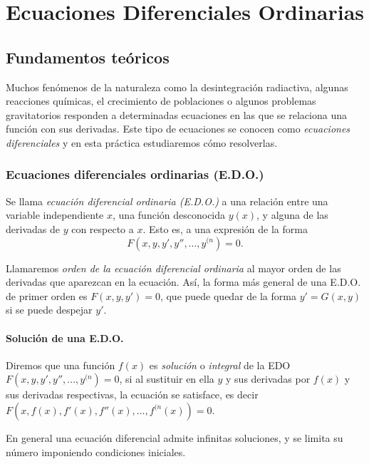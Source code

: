 
\chapter{Ecuaciones Diferenciales Ordinarias}

\section{Fundamentos teóricos}

Muchos fenómenos de la naturaleza como la desintegración radiactiva, algunas reacciones químicas, el crecimiento de
poblaciones o algunos problemas gravitatorios responden a determinadas ecuaciones en las que se relaciona una función
con sus derivadas. 
Este tipo de ecuaciones se conocen como \emph{ecuaciones diferenciales} y en esta práctica
estudiaremos cómo resolverlas.

\subsection{Ecuaciones diferenciales ordinarias (E.D.O.)}
Se llama \emph{ecuación diferencial ordinaria (E.D.O.)} a una relación entre una variable independiente $x$, una función
desconocida $y(x)$, y alguna de las derivadas de $y$ con respecto a $x$. 
Esto es, a una expresión de la forma
\[
F(x,y,y',y'',...,y^{(n})=0.
\]

Llamaremos \emph{orden de la ecuación diferencial ordinaria} al mayor orden de las derivadas que aparezcan en la
ecuación. 
Así, la forma más general de una E.D.O. de primer orden es $F(x,y,y')=0$, que puede quedar de la forma $y'=G(x,y)$ si se
puede despejar $y'$.

\subsubsection*{Solución de una E.D.O.}
Diremos que una función $f(x)$ es \emph{solución} o \emph{integral} de la EDO $F(x,y,y',y'',...,y^{(n})=0$, si al
sustituir en ella $y$ y sus derivadas por $f(x)$ y sus derivadas respectivas, la ecuación se satisface, es decir
$F(x,f(x),f'(x),f''(x),...,f^{(n}(x))=0$.

En general una ecuación diferencial admite infinitas soluciones, y se limita su número imponiendo condiciones iniciales.


